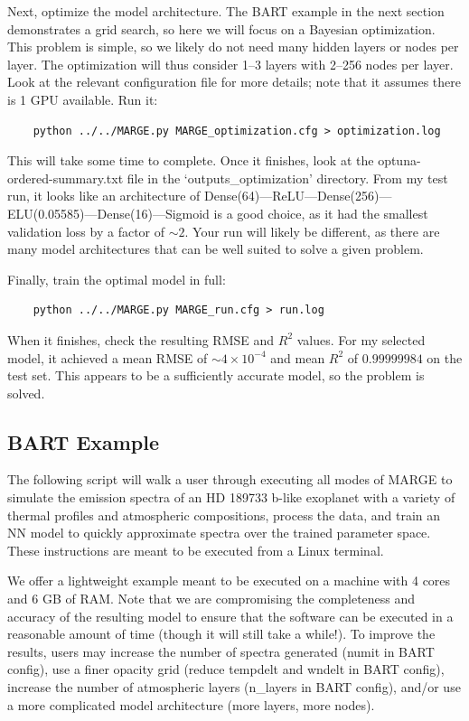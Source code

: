 \documentclass[letterpaper, 12pt]{article}
\begin{document}
\noindent Next, optimize the model architecture.  The BART example in the next 
section demonstrates a grid search, so here we will focus on a Bayesian 
optimization.  This problem is simple, so we likely do not need many hidden 
layers or nodes per layer.  The optimization will thus consider 1--3 layers 
with 2--256 nodes per layer.  Look at the relevant configuration file for more 
details; note that it assumes there is 1 GPU available.  Run it:
\begin{verbatim}
	python ../../MARGE.py MARGE_optimization.cfg > optimization.log
\end{verbatim}
\noindent This will take some time to complete.  Once it finishes, look at the 
optuna-ordered-summary.txt file in the `outputs\_optimization' directory.
From my test run, it looks like an architecture of 
Dense(64)---ReLU---Dense(256)---ELU(0.05585)---Dense(16)---Sigmoid 
is a good choice, as it had the smallest validation loss by a factor of 
${\sim}2$.  Your run will likely be different, as there are many model 
architectures that can be well suited to solve a given problem.\newline

\noindent Finally, train the optimal model in full:
\begin{verbatim}
	python ../../MARGE.py MARGE_run.cfg > run.log
\end{verbatim}
\noindent When it finishes, check the resulting RMSE and $R^2$ values.  
For my selected model, it achieved a mean RMSE of ${\sim}4{\times}10^{-4}$ and 
mean $R^2$ of $0.99999984$ on the test set.  This appears to be a sufficiently 
accurate model, so the problem is solved.


\subsection{BART Example}

\noindent The following script will walk a user through executing all modes of 
MARGE to simulate the emission spectra of an HD 189733 b-like exoplanet with a 
variety of thermal profiles and atmospheric compositions, process the data, and 
train an NN model to quickly approximate spectra over the trained parameter 
space.  These instructions are meant to be executed from a Linux terminal.  

We offer a lightweight example meant to be executed on a machine with 4 cores 
and 6 GB of RAM.  Note that we are compromising the completeness and accuracy 
of the resulting model to ensure that the software can be executed in a 
reasonable amount of time (though it will still take a while!).  To improve 
the results, users may increase the number of spectra generated (numit in BART 
config), use a finer opacity grid (reduce tempdelt and wndelt in BART config), 
increase the number of atmospheric layers (n\_layers in BART config), and/or 
use a more complicated model architecture (more layers, more nodes).
\end{document}
